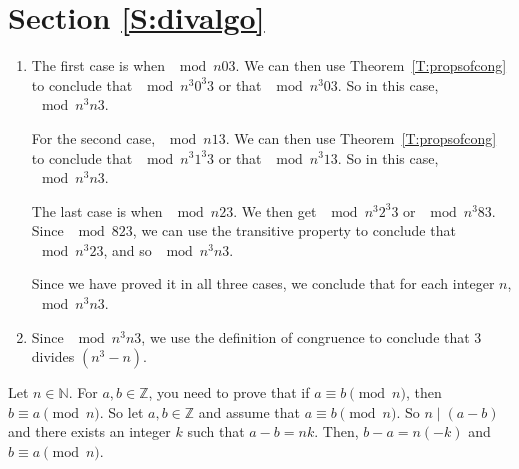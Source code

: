 \section*{Section \ref{S:divalgo}}
\renewcommand{\labelenumi}{(\textbf{\alph{enumi}})}


\begin{list}{\bf{\ref{exer:sec35-2}.}}
\item \begin{enumerate}
\item The first case is when $\mod{n}{0}{3}$.  We can then use Theorem~\ref{T:propsofcong} to conclude that $\mod{n^3}{0^3}{3}$ or that $\mod{n^3}{0}{3}$.  So in this case, $\mod{n^3}{n}{3}$.

\noindent
For the second case, $\mod{n}{1}{3}$.  We can then use Theorem~\ref{T:propsofcong} to conclude that $\mod{n^3}{1^3}{3}$ or that $\mod{n^3}{1}{3}$.  So in this case, $\mod{n^3}{n}{3}$.

\noindent
The last case is when $\mod{n}{2}{3}$.  We then get $\mod{n^3}{2^3}{3}$ or $\mod{n^3}{8}{3}$.  Since $\mod{8}{2}{3}$, we can use the transitive property to conclude that $\mod{n^3}{2}{3}$, and so $\mod{n^3}{n}{3}$.

\noindent
Since we have proved it in all three cases, we conclude that for each integer $n$, $\mod{n^3}{n}{3}$.

\item Since $\mod{n^3}{n}{3}$, we use the definition of congruence to conclude that 3 divides $\left( n^3 - n \right)$.
\end{enumerate}
\end{list}



\begin{list}{\bf{\ref{exer:cong-symm}.}}
\item Let  $n \in \mathbb{N}$.  For  $a, b \in \mathbb{Z}$, you need to prove that if  
$a \equiv b \pmod n$,  then  $b \equiv a \pmod n$.  So let  $a, b \in \mathbb{Z}$ and assume that 
$a \equiv b \pmod n$.  So $n \mid \left( a - b \right)$ and there exists an integer $k$ such that 
$a - b = nk$.  Then, $b - a = n ( -k )$ and $b \equiv a \pmod n$.
\end{list}


